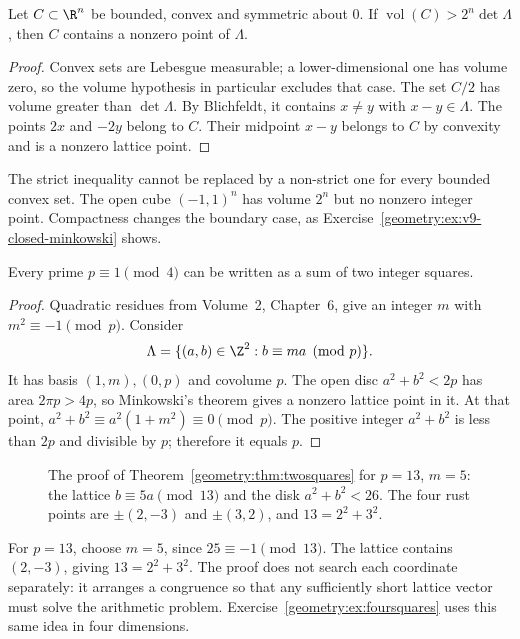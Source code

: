 \begin{theorem}[Minkowski]\label{geometry:thm:minkowski}
Let $C\subset\R^n$ be bounded, convex and symmetric about $0$.
If $\operatorname{vol}(C)>2^n\det\Lambda$, then $C$ contains a
nonzero point of $\Lambda$.
\end{theorem}
\begin{proof}
Convex sets are Lebesgue measurable; a lower-dimensional one has volume
zero, so the volume hypothesis in particular excludes that case.
The set $C/2$ has volume greater than $\det\Lambda$.
By Blichfeldt, it contains $x\ne y$ with $x-y\in\Lambda$.
The points $2x$ and $-2y$ belong to $C$. Their midpoint $x-y$ belongs
to $C$ by convexity and is a nonzero lattice point.
\end{proof}

The strict inequality cannot be replaced by a non-strict one for every
bounded convex set. The open cube $(-1,1)^n$ has volume $2^n$ but no
nonzero integer point. Compactness changes the boundary case, as
Exercise~\ref{geometry:ex:v9-closed-minkowski} shows.

\begin{theorem}[Fermat]\label{geometry:thm:twosquares}
Every prime $p\equiv1\pmod4$ can be written as a sum of two integer squares.
\end{theorem}
\begin{proof}
Quadratic residues from Volume~2, Chapter~6, give an integer $m$ with
$m^2\equiv-1\pmod p$. Consider
\[
 \Lambda=\{(a,b)\in\Z^2:b\equiv ma\pmod p\}.
\]
It has basis $(1,m),(0,p)$ and covolume $p$.
The open disc $a^2+b^2<2p$ has area $2\pi p>4p$, so Minkowski's
theorem gives a nonzero lattice point in it. At that point,
$a^2+b^2\equiv a^2(1+m^2)\equiv0\pmod p$.
The positive integer $a^2+b^2$ is less than $2p$ and divisible by $p$;
therefore it equals $p$.
\end{proof}

\begin{figure}[ht]
\centering
{}
\caption{The proof of Theorem~\ref{geometry:thm:twosquares} for $p=13$, $m=5$: the lattice $b\equiv5a\pmod{13}$ and the disk $a^2+b^2<26$. The four rust points are
$\pm(2,-3)$ and $\pm(3,2)$, and $13=2^2+3^2$.}
\label{geometry:fig:twosquares}
\end{figure}

For $p=13$, choose $m=5$, since $25\equiv-1\pmod{13}$.
The lattice contains $(2,-3)$, giving $13=2^2+3^2$.
The proof does not search each coordinate separately: it arranges a
congruence so that any sufficiently short lattice vector must solve the
arithmetic problem. Exercise~\ref{geometry:ex:foursquares} uses this
same idea in four dimensions.


